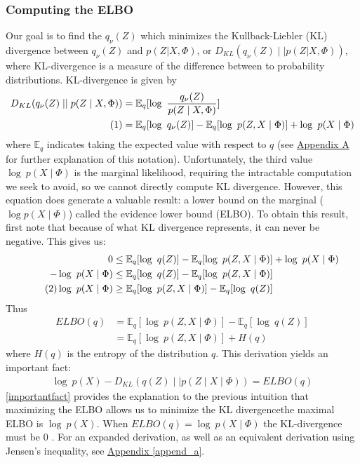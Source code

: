 \documentclass[12pt,letterpaper]{article}
\newcommand\numberthis{\addtocounter{equation}{1}\tag{\theequation}}
\begin{document}
\subsubsection{Computing the ELBO}
Our goal is to find the $q_{\nu}(Z)$ which minimizes the Kullback-Liebler (KL) divergence between $q_{\nu}(Z)$ and $p(Z|X, \Phi)$, or $D_{KL}(q_{\nu}(Z) \mid \mid p(Z|X, \Phi))$, where KL-divergence is a measure of the difference between to probability distributions.  KL-divergence is given by 
\begin{align*}
  \nonumber D_{KL}(q_\nu (Z) \mid \mid  p(Z\mid X,\Phi)) &= \mathbb{E}_q[\log\ \frac{q_\nu(Z)}{p(Z\mid X,\Phi)}] \\
 \numberthis &=  \mathbb{E}_q [\log\ q_\nu(Z)] - \mathbb{E}_q [\log\ p(Z,X\mid \Phi)] + \log\ p(X\mid \Phi) 
\end{align*}
 where $\mathbb{E}_q$ indicates taking the expected value with respect to $q$ (see \hyperref[expectedvalue]{Appendix A} for further explanation of this notation). Unfortunately, the third value $\log\ p(X\mid \Phi) $ is the marginal likelihood, requiring the intractable computation we seek to avoid, so we cannot directly compute KL divergence. However, this equation does generate a valuable result: a lower bound on the marginal ($\log p(X \mid \Phi)$) called the evidence lower bound (ELBO). To obtain this result, first note that because of what KL divergence represents, it can never be negative. This gives us: 
\begin{align*}
\nonumber 0 &\leq \mathbb{E}_q [\log\ q(Z)] - \mathbb{E}_q [\log\ p(Z,X \mid \Phi)] + \log\ p(X \mid \Phi)\\
\nonumber - \log\ p(X \mid \Phi) &\leq \mathbb{E}_q [\log\ q(Z)] - \mathbb{E}_q [\log\ p(Z,X \mid \Phi)]  \\
\numberthis\log\ p(X \mid \Phi) &\geq \mathbb{E}_q [\log\ p(Z,X \mid \Phi)] - \mathbb{E}_q [\log\ q(Z)] 
\end{align*}
Thus \begin{align*}
ELBO(q) &=  \mathbb{E}_q [\log\ p(Z,X \mid \Phi)] - \mathbb{E}_q [\log\ q(Z)] \\
&= \mathbb{E}_q [\log\ p(Z,X \mid \Phi)] + H(q) \end{align*}
where $H(q)$ is the entropy of the distribution $q$.
This derivation yields an important fact: 
\begin{align}
\label{importantfact}
\log\ p(X) - D_{KL}(q(Z) \mid \mid  p(Z\mid X \mid \Phi)) = ELBO(q)
\end{align}
\eqref{importantfact} provides the explanation to the previous intuition that maximizing the ELBO allows us to minimize the KL divergence\textemdash the maximal ELBO is $\log\ p(X)$. When $ELBO(q) = \log\ p(X \mid \Phi)$ the KL-divergence must be 0 \citep{blei:2017}. For an expanded derivation, as well as an equivalent derivation using Jensen's inequality, see \hyperref[append_a]{Appendix \ref*{append_a}}. 
\end{document}
